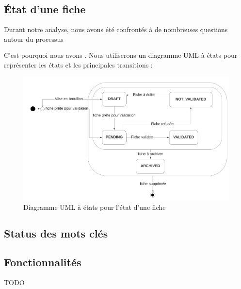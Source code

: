 \pagebreak

\subsection*{État d'une fiche}

Durant notre analyse, nous avons été confrontés à de nombreuses questions autour du processus 





C'est pourquoi nous avons . Nous utiliserons un diagramme UML à états pour représenter les états et les principales transitions :

\begin{figure}[H]
    \includegraphics[width=\textwidth,height=\textheight,keepaspectratio]{images/StateFiches.png}
    \caption{Diagramme UML à états pour l'état d'une fiche}
    \label{pic:stateDiagramForFiches}
\end{figure}



\subsection*{Status des mots clés}



\subsection*{Fonctionnalités}

TODO





